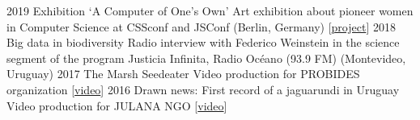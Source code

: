 \documentclass[9pt]{developercv} %
\begin{document}
\begin{entrylist}
	\entrylong
		{2019}
		{Exhibition ‘A Computer of One’s Own’}
		{}
		{Art exhibition about pioneer women in Computer Science at CSSconf and JSConf (Berlin, Germany) [\href{https://medium.com/a-computer-of-ones-own}{project}]}
	\entrylong
		{2018}
		{Big data in biodiversity}
		{}
		{Radio interview with Federico Weinstein in the science segment of the program Justicia Infinita, Radio Océano (93.9 FM) (Montevideo, Uruguay)}
	\entrylong
		{2017}
		{The Marsh Seedeater}
		{}
		{Video production for PROBIDES organization [\href{https://youtu.be/EYKt83ShWQ8}{video}]}
	\entrylong
		{2016}
		{Drawn news: First record of a jaguarundi in Uruguay}
		{}
		{Video production for JULANA NGO [\href{https://youtu.be/Zva9m9hmXCc}{video}]}	
\end{entrylist}




%
%	
%	
%	
%	
%	

%
%
%
%
%
\end{document}
